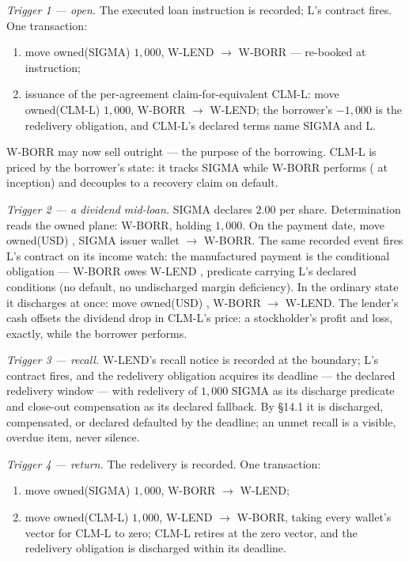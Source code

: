 \emph{Trigger 1 --- open.} The executed loan instruction is recorded; L's
contract fires. One transaction:
\begin{enumerate}[label=(\arabic*),nosep]
\item move owned(SIGMA) $1{,}000$, W-LEND $\to$ W-BORR --- re-booked at
instruction;
\item issuance of the per-agreement claim-for-equivalent CLM-L: move
owned(CLM-L) $1{,}000$, W-BORR $\to$ W-LEND; the borrower's $-1{,}000$ is the
redelivery obligation, and CLM-L's declared terms name SIGMA and L.
\end{enumerate}
W-BORR may now sell outright --- the purpose of the borrowing. CLM-L is
priced by the borrower's state: it tracks SIGMA while W-BORR performs
( at inception) and decouples to a recovery claim on default.

\emph{Trigger 2 --- a dividend mid-loan.} SIGMA declares $2.00$ per share.
Determination reads the owned plane: W-BORR, holding $1{,}000$. On the payment
date, move owned(USD) , SIGMA issuer wallet $\to$ W-BORR. The same
recorded event fires L's contract on its income watch: the manufactured
payment is the conditional obligation --- W-BORR owes W-LEND ,
predicate carrying L's declared conditions (no default, no undischarged margin
deficiency). In the ordinary state it discharges at once: move owned(USD)
, W-BORR $\to$ W-LEND. The lender's cash offsets the dividend drop
in CLM-L's price: a stockholder's profit and loss, exactly, while the borrower
performs.

\emph{Trigger 3 --- recall.} W-LEND's recall notice is recorded at the
boundary; L's contract fires, and the redelivery obligation acquires its
deadline --- the declared redelivery window --- with redelivery of $1{,}000$
SIGMA as its discharge predicate and close-out compensation as its declared
fallback. By \S14.1 it is discharged, compensated, or declared defaulted by
the deadline; an unmet recall is a visible, overdue item, never silence.

\emph{Trigger 4 --- return.} The redelivery is recorded. One transaction:
\begin{enumerate}[label=(\arabic*),nosep]
\item move owned(SIGMA) $1{,}000$, W-BORR $\to$ W-LEND;
\item move owned(CLM-L) $1{,}000$, W-LEND $\to$ W-BORR, taking every wallet's
vector for CLM-L to zero; CLM-L retires at the zero vector, and the
redelivery obligation is discharged within its deadline.
\end{enumerate}

